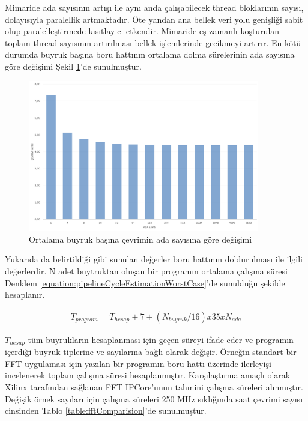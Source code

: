 Mimaride ada sayısının artışı ile aynı anda çalışabilecek thread bloklarının sayısı, dolayısıyla paralellik artmaktadır. Öte yandan ana bellek veri yolu genişliği sabit olup paralelleştirmede kısıtlayıcı etkendir. Mimaride eş zamanlı koşturulan toplam thread sayısının artırılması bellek işlemlerinde gecikmeyi artırır. En kötü durumda buyruk başına boru hattının ortalama dolma sürelerinin ada sayısına göre değişimi Şekil \ref{image:fillPipelineWorstVsNumOfIslands}'de sunulmuştur.\par

\begin{figure}[ht]
\centering
\shorthandoff{=}
\includegraphics[width=0.9\textwidth]{gorsel/fillPipelineWorstVsNumOfIslands.png}
\shorthandoff{=}
\caption{Ortalama buyruk başına çevrimin ada sayısına göre değişimi}
\label{image:fillPipelineWorstVsNumOfIslands}
\end{figure}

Yukarıda da belirtildiği gibi sunulan değerler boru hattının doldurulması ile ilgili değerlerdir. N adet buytruktan oluşan bir programın ortalama çalışma süresi Denklem \ref{equation:pipelineCycleEstimationWorstCase}'de sunulduğu şekilde hesaplanır. \par

\begin{align} \label{equation:pipelineCycleEstimationWorstCase}
	T_{program}= T_{hesap} + 7 + (N_{buyruk}/16) x 35 x N_{ada}
\end{align}

$T_{hesap}$ tüm buyrukların hesaplanması için geçen süreyi ifade eder ve programın içerdiği buyruk tiplerine ve sayılarına bağlı olarak değişir. Örneğin standart bir FFT uygulaması için yazılan bir programın boru hattı üzerinde ilerleyişi incelenerek toplam çalışma süresi hesaplanmıştır. Karşılaştırma amaçlı olarak Xilinx tarafından sağlanan FFT IPCore'unun tahmini çalışma süreleri alınmıştır. Değişik örnek sayıları için çalışma süreleri 250 MHz sıklığında saat çevrimi sayısı cinsinden Tablo \ref{table:fftComparision}'de sunulmuştur.

